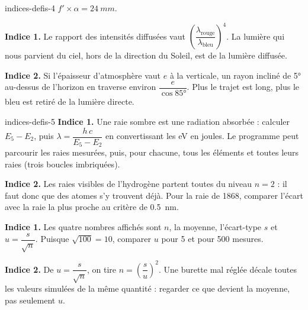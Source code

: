 \begin{blocEdition}{indices-defis-4}
$f'\times\alpha=\qty{24}{mm}$.\par\smallskip
{}
\textbf{Indice 1.} Le rapport des intensités diffusées vaut $\left(\dfrac{\lambda_\text{rouge}}{\lambda_\text{bleu}}\right)^4$. La lumière qui nous parvient du ciel, hors de la direction du Soleil,
est de la lumière diffusée.\par\smallskip
\textbf{Indice 2.} Si l'épaisseur d'atmosphère vaut $e$ à la verticale, un rayon incliné de \ang{5} au-dessus de l'horizon en traverse environ $\dfrac{e}{\cos\ang{85}}$. Plus le
trajet est long, plus le bleu est retiré de la lumière directe.\par\smallskip
\end{blocEdition}

\begin{blocEdition}{indices-defis-5}
\textbf{Indice 1.} Une raie sombre est une radiation absorbée : calculer $E_5-E_2$, puis $\lambda=\dfrac{h\,c}{E_5-E_2}$ en convertissant les eV en joules.
Le programme peut parcourir les raies mesurées, puis, pour chacune, tous les éléments et toutes leurs raies (trois boucles imbriquées).\par\smallskip
\textbf{Indice 2.} Les raies visibles de l'hydrogène partent toutes du niveau $n=2$ : il faut donc que des atomes s'y trouvent déjà. Pour la
raie de 1868, comparer l'écart avec la raie la plus proche au critère de \qty{0,5}{nm}.\par\smallskip
{}
\textbf{Indice 1.} Les quatre nombres affichés sont $n$, la moyenne, l'écart-type $s$ et $u=\dfrac{s}{\sqrt{n}}$. Puisque $\sqrt{100}=10$, comparer $u$ pour 5 et pour
500 mesures.\par\smallskip
\textbf{Indice 2.} De $u=\dfrac{s}{\sqrt{n}}$, on tire $n=\left(\dfrac{s}{u}\right)^2$. Une burette mal réglée décale toutes les valeurs simulées de la même quantité :
regarder ce que devient la moyenne, pas seulement $u$.\par\smallskip
\end{blocEdition}
